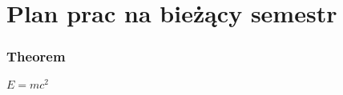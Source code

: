 \section{Plan prac na bieżący semestr}

\begin{frame}
    \frametitle{Theorem}
    \begin{theorem}
    $E = mc^2$
    \end{theorem}
\end{frame}
